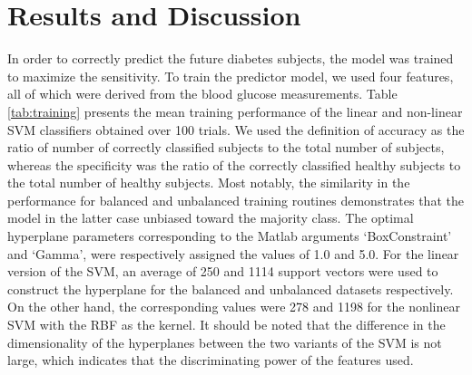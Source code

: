 \documentclass[journal,comsoc]{IEEEtran}
\renewcommand{\^}{\hat}  %
\begin{document}
%
\section{Results and Discussion}
%
%
In order to correctly predict the future diabetes subjects, the model was trained to maximize the sensitivity. To train the predictor model, we used four features, all of which were derived from the blood glucose measurements. Table \ref{tab:training} presents the mean training performance of the linear and non-linear SVM classifiers obtained over \num{100} trials. We used the definition of accuracy as the ratio of number of correctly classified subjects to the total number of subjects, whereas the specificity was the ratio of the correctly classified healthy subjects to the total number of healthy subjects. Most notably, the similarity in the performance for balanced and unbalanced training routines demonstrates that the model in the latter case unbiased toward the majority class. The optimal hyperplane parameters corresponding to the Matlab arguments `BoxConstraint' and `Gamma', were respectively assigned the values of \num{1.0} and \num{5.0}. For the linear version of the SVM, an average of \num{250} and \num[group-minimum-digits=4, group-separator = {,}]{1114} support vectors were used to construct the hyperplane for the balanced and unbalanced datasets respectively. On the other hand, the corresponding values were \num{278} and \num[group-minimum-digits=4, group-separator = {,}]{1198} for the nonlinear SVM with the RBF as the kernel. It should be noted that the difference in the dimensionality of the hyperplanes between the two variants of the SVM is not large, which indicates that the discriminating power of the features used.
\end{document}
